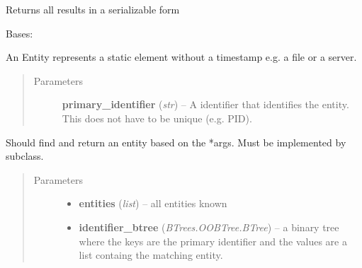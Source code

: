\documentclass[letterpaper,10pt,english]{sphinxmanual}
\begin{document}
\begin{fulllineitems}
\begin{fulllineitems}
\end{fulllineitems}


\begin{fulllineitems}
\label{ambrosia.model:ambrosia.model.Analysis.to_serializeable}
Returns all results in a serializable form

\end{fulllineitems}


\end{fulllineitems}


\begin{fulllineitems}
\label{ambrosia.model:ambrosia.model.Entity}
Bases: 

An Entity represents a static element without a timestamp e.g. a file or a server.
\begin{quote}\begin{description}
\item[{Parameters}] \leavevmode
\textbf{primary\_identifier} (\emph{str}) -- A identifier that identifies the entity. This does not have to be unique
(e.g. PID).

\end{description}\end{quote}

\begin{fulllineitems}
\label{ambrosia.model:ambrosia.model.Entity.find}
Should find and return an entity based on the *args. Must be implemented by subclass.
\begin{quote}\begin{description}
\item[{Parameters}] \leavevmode\begin{itemize}
\item {} 
\textbf{entities} (\emph{list}) -- all entities known

\item {} 
\textbf{identifier\_btree} (\emph{BTrees.OOBTree.BTree}) -- a binary tree where the keys are the primary identifier and the
values are a list containg the matching entity.


\end{itemize}
\end{description}
\end{quote}
\end{fulllineitems}
\end{fulllineitems}
\end{document}
